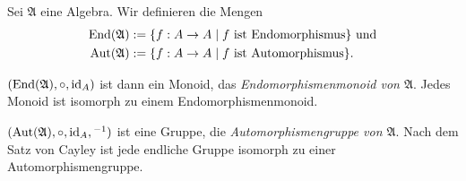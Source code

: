 \begin{example}
    Sei $\mathfrak{A}$ eine Algebra. Wir definieren die Mengen \begin{align*}
        \operatorname{End}(\mathfrak{A}) &:= \{f: A \to A \mid f\text{ ist Endomorphismus}\} \text{ und} \\ \operatorname{Aut}(\mathfrak{A}) &:= \{f: A \to A \mid f\text{ ist Automorphismus}\}.
    \end{align*}

    $(\operatorname{End}(\mathfrak{A}), \circ, \operatorname{id}_A)$ ist dann ein Monoid, das \emph{Endomorphismenmonoid von $\mathfrak{A}$}. Jedes Monoid ist isomorph zu einem Endomorphismenmonoid.
    
    $(\operatorname{Aut}(\mathfrak{A}), \circ, \operatorname{id}_A, {}^{-1})$ ist eine Gruppe, die \emph{Automorphismengruppe von $\mathfrak{A}$}. Nach dem Satz von Cayley ist jede endliche Gruppe isomorph zu einer Automorphismengruppe.
\end{example}